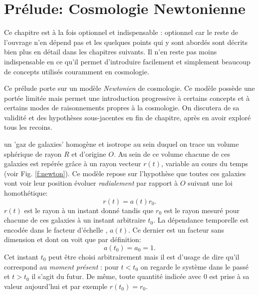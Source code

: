 \chapter{Prélude: Cosmologie Newtonienne}

Ce chapitre est à la fois optionnel et indispensable : optionnel car le reste de l'ouvrage n'en dépend pas et les quelques points qui y sont abordés sont décrits bien plus en détail dans les chapitres suivants. Il n'en reste pas moins indispensable en ce qu'il permet d'introduire facilement et simplement beaucoup de concepts utilisés couramment en cosmologie.

Ce prélude porte sur un modèle \textit{Newtonien} de cosmologie. Ce modèle possède une portée limitée mais permet une introduction progressive à certains concepts et à certains modes de raisonnements propres à la cosmologie. On discutera de sa validité et des hypothèses sous-jacentes en fin de chapitre, après en avoir exploré tous les recoins.

 un 'gaz de galaxies'  homogène et isotrope au sein duquel on trace un volume sphérique de rayon $R$ et d'origine $O$. Au sein de ce volume chacune de ces galaxies est repérée grâce à un rayon vecteur $r(t)$, variable au cours du temps (voir Fig. \ref{f:newton}). Ce modèle repose sur l'hypothèse que toutes ces galaxies vont voir leur position évoluer \textit{radialement} par rapport à $O$ suivant une loi homothétique:
\begin{equation}
r(t)=a(t)r_0.
\end{equation}
$r(t)$ est le rayon à un instant donné tandis que $r_0$ est le rayon mesuré pour chacune de ces galaxies à un instant arbitraire $t_0$. La dépendance temporelle est encodée dans le facteur d'échelle , $a(t)$. Ce dernier est un facteur sans dimension et dont on voit que par définition:
\begin{equation}
a(t_0)=a_0=1.
\end{equation}
Cet instant $t_0$ peut être choisi arbitrairement mais il est d'usage de dire qu'il correspond au \textit{moment présent} : pour $t<t_0$ on regarde le système dans le passé et $t>t_0$ il s'agit du futur. De même, toute quantité indicée avec $0$ est prise à sa valeur aujourd'hui et par exemple $r(t_0)=r_0$.

